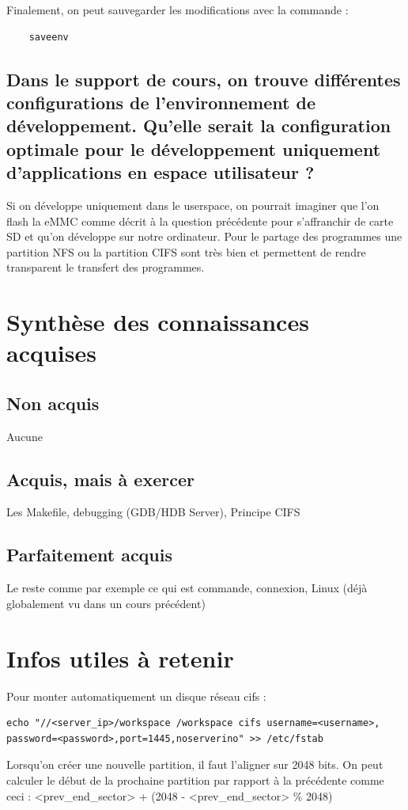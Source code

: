\documentclass{ReportTemplate}
\begin{document}
Finalement, on peut sauvegarder les modifications avec la commande :\newline
\begin{verbatim}
    saveenv
\end{verbatim}
\subsection{Dans le support de cours, on trouve différentes configurations de l’environnement de développement. Qu’elle serait la configuration optimale pour le développement uniquement d’applications en espace utilisateur ?}
Si on développe uniquement dans le userspace, on pourrait imaginer que l'on
flash la eMMC comme décrit à la question précédente pour s'affranchir de carte
SD et qu'on développe sur notre ordinateur. Pour le partage des programmes une
partition NFS ou la partition CIFS sont très bien et permettent de rendre
transparent le transfert des programmes.
\newpage
\section{Synthèse des connaissances acquises}
\subsection{Non acquis}
Aucune
\subsection{Acquis, mais à exercer}
Les Makefile, debugging (GDB/HDB Server), Principe CIFS
\subsection{Parfaitement acquis}
Le reste comme par exemple ce qui est commande, connexion, Linux (déjà
globalement vu dans un cours précédent)
\section{Infos utiles à retenir}
Pour monter automatiquement un disque réseau cifs : \newline
\begin{verbatim}
echo "//<server_ip>/workspace /workspace cifs username=<username>,
password=<password>,port=1445,noserverino" >> /etc/fstab
\end{verbatim}
Lorsqu'on créer une nouvelle partition, il faut l'aligner sur 2048 bits. On peut
calculer le début de la prochaine partition par rapport à la précédente comme
ceci : \newline
<prev\_end\_sector> + (2048 - <prev\_end\_sector>  \% 2048)
\end{document}
